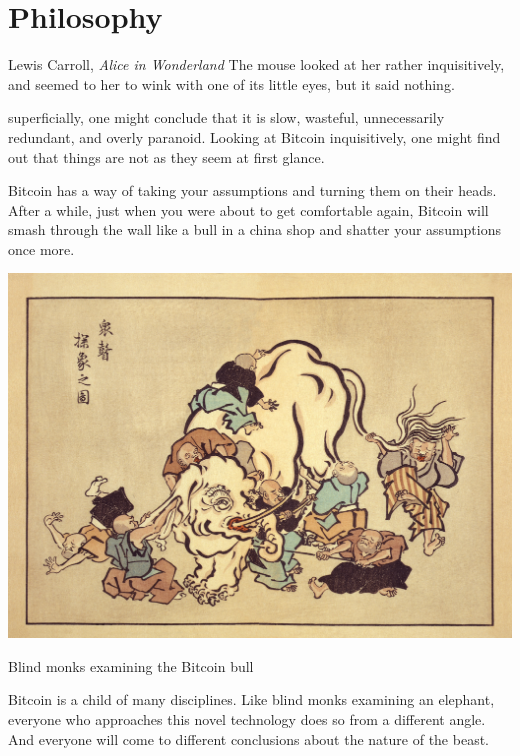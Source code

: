 \part{Philosophy}
\label{ch:philosophy}

\begin{chapquote}{Lewis Carroll, \textit{Alice in Wonderland}}
The mouse looked at her rather inquisitively, and seemed to her to wink with one
of its little eyes, but it said nothing.
\end{chapquote}

 superficially, one might conclude that it is slow, wasteful,
unnecessarily redundant, and overly paranoid. Looking at Bitcoin inquisitively,
one might find out that things are not as they seem at first glance.

Bitcoin has a way of taking your assumptions and turning them on their heads.
After a while, just when you were about to get comfortable again, Bitcoin will
smash through the wall like a bull in a china shop and shatter your assumptions
once more.

\begin{marginfigure}
  \includegraphics{assets/images/blind-monks.jpg}
  \caption{Blind monks examining the Bitcoin bull}
  \label{fig:blind-monks}
\end{marginfigure}

Bitcoin is a child of many disciplines. Like blind monks examining an elephant,
everyone who approaches this novel technology does so from a different angle.
And everyone will come to different conclusions about the nature of the beast.

